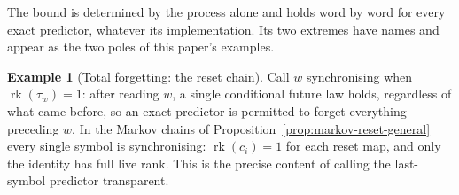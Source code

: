 \documentclass[10pt]{article}
\theoremstyle{definition}
\newtheorem{example}[theorem]{Example}
\theoremstyle{remark}
\newcommand{\rk}{\operatorname{rk}}
\begin{document}
The bound is determined by the process alone and holds word by word for
every exact predictor, whatever its implementation.  Its two extremes
have names and appear as the two poles of this paper's examples.

\begin{example}[Total forgetting: the reset chain]
Call $w$ synchronising when $\rk(\tau_w)=1$: after reading $w$, a single
conditional future law holds, regardless of what came before, so an
exact predictor is permitted to forget everything preceding $w$.  In the
Markov chains of Proposition~\ref{prop:markov-reset-general} every
single symbol is synchronising: $\rk(c_i)=1$ for each reset map, and
only the identity has full live rank.  This is the precise content of
calling the last-symbol predictor transparent.
\end{example}
\end{document}
